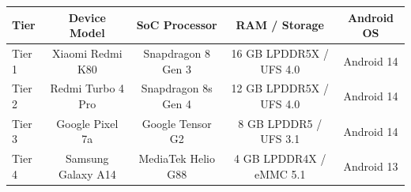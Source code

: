 \documentclass[preview,varwidth=90mm]{standalone}
\begin{document}
\begin{table}[h]
\centering
\footnotesize
\begin{tabular}{lcccc}
\toprule
\textbf{Tier} & \textbf{Device Model} & \textbf{SoC Processor} & \textbf{RAM / Storage} & \textbf{Android OS} \\ \midrule
Tier 1 & Xiaomi Redmi K80 & Snapdragon 8 Gen 3 & 16 GB LPDDR5X / UFS 4.0 & Android 14 \\
Tier 2 & Redmi Turbo 4 Pro & Snapdragon 8s Gen 4 & 12 GB LPDDR5X / UFS 4.0 & Android 14 \\
Tier 3 & Google Pixel 7a & Google Tensor G2 & 8 GB LPDDR5 / UFS 3.1 & Android 14 \\
Tier 4 & Samsung Galaxy A14 & MediaTek Helio G88 & 4 GB LPDDR4X / eMMC 5.1 & Android 13 \\ \bottomrule
\end{tabular}
\end{table}
\end{document}
